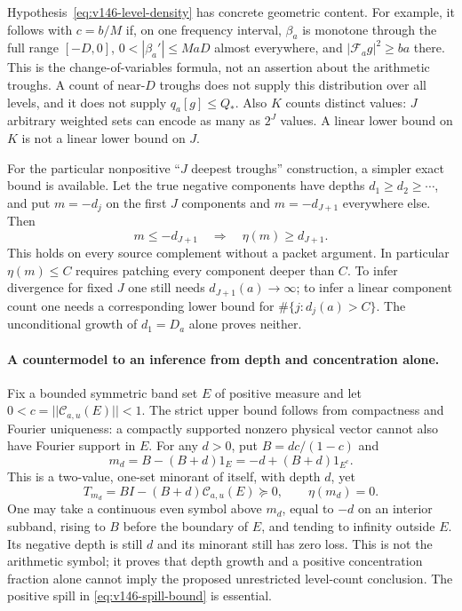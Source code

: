 \documentclass[11pt]{article}
\def\norm#1{||#1||}%
\theoremstyle{remark}
\newcommand{\norm}[1]{\left\lVert #1\right\rVert}
\begin{document}
Hypothesis~\eqref{eq:v146-level-density} has concrete geometric
content. For example, it follows with $c=b/M$ if, on one frequency
interval, $\beta_a$ is monotone through the full range $[-D,0]$,
$0<|\beta_a'|\le MaD$ almost everywhere, and
$|\mathcal F_ag|^2\ge ba$ there. This is the change-of-variables
formula, not an assertion about the arithmetic troughs. A count of
near-$D$ troughs does not supply this distribution over all levels,
and it does not supply $q_a[g]\le Q_*$. Also $K$ counts distinct values:
$J$ arbitrary weighted sets can encode as many as $2^J$ values. A
linear lower bound on $K$ is not a linear lower bound on $J$.

For the particular nonpositive ``$J$ deepest troughs'' construction,
a simpler exact bound is available. Let the true negative components
have depths $d_1\ge d_2\ge\cdots$, and put $m=-d_j$ on the first
$J$ components and $m=-d_{J+1}$ everywhere else. Then
\begin{equation}\label{eq:v146-lobe-floor}
 m\le-d_{J+1}\quad\Longrightarrow\quad\eta(m)\ge d_{J+1}.
\end{equation}
This holds on every source complement without a packet argument.
In particular $\eta(m)\le C$ requires patching every component deeper
than $C$. To infer divergence for fixed $J$ one still needs
$d_{J+1}(a)\to\infty$; to infer a linear component count one needs a
corresponding lower bound for $\#\{j:d_j(a)>C\}$. The unconditional
growth of $d_1=D_a$ alone proves neither.

\paragraph{A countermodel to an inference from depth and concentration alone.}
Fix a bounded symmetric band set $E$ of positive measure and let
$0<c=\norm{\mathcal C_{a,u}(E)}<1$. The strict upper bound follows
from compactness and Fourier uniqueness: a compactly supported
nonzero physical vector cannot also have Fourier support in $E$.
For any $d>0$, put $B=dc/(1-c)$ and
\[
 m_d=B-(B+d)1_E=-d+(B+d)1_{E^c}.
\]
This is a two-value, one-set minorant of itself, with depth $d$, yet
\[
 T_{m_d}=B I-(B+d)\mathcal C_{a,u}(E)\succeq0,
 \qquad \eta(m_d)=0.
\]
One may take a continuous even symbol above $m_d$, equal to $-d$ on
an interior subband, rising to $B$ before the boundary of $E$, and
tending to infinity outside $E$. Its negative depth is still $d$ and
its minorant still has zero loss. This is not the arithmetic symbol;
it proves that depth growth and a positive concentration fraction
alone cannot imply the proposed unrestricted level-count conclusion.
The positive spill in \eqref{eq:v146-spill-bound} is essential.
\end{document}
